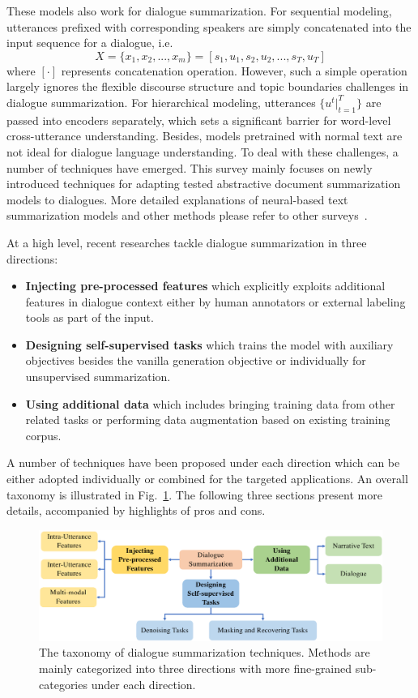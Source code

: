 These models also work for dialogue summarization.  
For sequential modeling, utterances prefixed with corresponding speakers are simply concatenated into the 
input sequence for a dialogue, i.e. 
\begin{equation}
	X = \{x_1, x_2, ..., x_m\} = [s_1, u_1, s_2, u_2, ..., s_T, u_T]
\end{equation}
where $[\cdot]$ represents concatenation operation.
However, such a simple operation largely ignores the flexible discourse structure and topic boundaries challenges in dialogue summarization.
For hierarchical modeling, utterances $\{u^t|_{t=1}^{T}\}$ are passed into encoders separately, which sets a significant barrier for word-level cross-utterance understanding.
Besides, models pretrained with normal text are not ideal for dialogue language understanding. 
To deal with these challenges, a number of techniques have emerged. 
This survey mainly 
focuses on newly introduced techniques for adapting tested abstractive document summarization models to dialogues. 
More detailed explanations of
neural-based text summarization models and other methods please refer to
other surveys~\cite{shi2021neural,syed2021survey}.

At a high level, recent researches tackle dialogue summarization in 
three directions: %
\begin{itemize}
\item \textbf{Injecting pre-processed features} which explicitly exploits additional features in dialogue context either by human annotators or external labeling tools as part of the input.
\item \textbf{Designing self-supervised tasks} which trains the model with auxiliary objectives besides the vanilla generation objective or individually for unsupervised summarization.
\item \textbf{Using additional data} which includes bringing training data from other related tasks or performing data augmentation based on existing training corpus.
\end{itemize}
A number of techniques have been proposed under each direction
which can be either adopted individually or combined for the targeted applications. An overall taxonomy is 
illustrated in Fig.~\ref{fig:featuretaxonomy}. The following three sections present more details, accompanied by highlights of pros and cons.

\begin{figure}
	\centering
	\includegraphics[scale=0.65]{fig/approaches.pdf}
	\caption{The taxonomy of dialogue summarization techniques. Methods are mainly categorized into three directions with more fine-grained sub-categories 
under each direction.}
	\label{fig:featuretaxonomy}
\end{figure}


